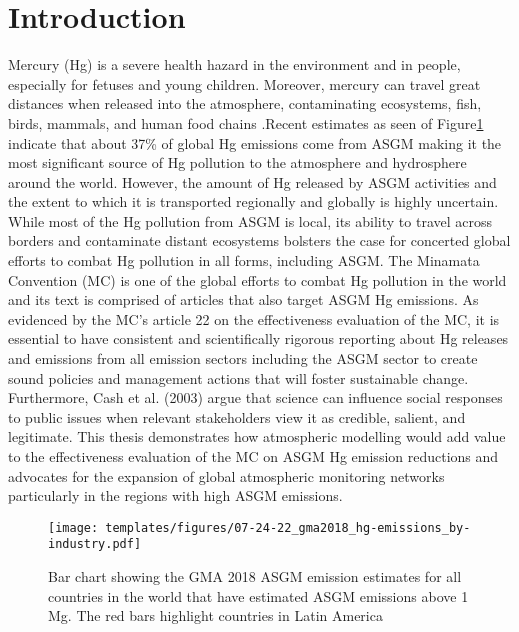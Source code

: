 
\chapter{Introduction}
Mercury (Hg) is a severe health hazard in the environment and in people, especially for fetuses and young children\cite{gibb_mercury_2014}. Moreover, mercury can travel great distances when released into the atmosphere, contaminating ecosystems, fish, birds, mammals, and human food chains \cite{esdaile_mercury_2018}.Recent estimates as seen of Figure\ref{} indicate that about 37\% of global Hg emissions come from ASGM making it the most significant source of Hg pollution to the atmosphere and hydrosphere around the world\cite{unep_minamata_2019}. However, the amount of Hg released by ASGM activities and the extent to which it is transported regionally and globally is highly uncertain. While most of the Hg pollution from ASGM is local, its ability to travel across borders and contaminate distant ecosystems bolsters the case for concerted global efforts to combat Hg pollution in all forms, including ASGM. The Minamata Convention (MC) is one of the global efforts to combat Hg pollution in the world and its text is comprised of articles that also target ASGM Hg emissions. As evidenced by the MC's article 22 on the effectiveness evaluation of the MC, it is essential to have consistent and scientifically rigorous reporting about Hg releases and emissions from all emission sectors including the ASGM sector to create sound policies and management actions that will foster sustainable change. Furthermore, Cash et al. (2003) argue that science can influence social responses to public issues when relevant stakeholders view it as credible, salient, and legitimate. This thesis demonstrates how atmospheric modelling would add value to the effectiveness evaluation of the MC on ASGM Hg emission reductions and advocates for the expansion of global atmospheric monitoring networks particularly in the regions with high ASGM emissions. 

\begin{figure}[H]
  \texttt{[image: templates/figures/07-24-22\_gma2018\_hg-emissions\_by-industry.pdf]}
  \centering
  \caption{Bar chart showing the GMA 2018 ASGM \hg emission estimates for all countries in the world that have estimated ASGM \hg emissions above 1 Mg. The red bars highlight countries in Latin America \cite{united_nations_environment_programme_technical_2019}}
  \label{fig:gma2018_hg-emissions_by-industry}
\end{figure}
\FloatBarrier

